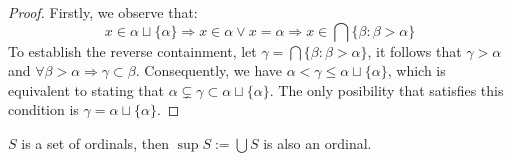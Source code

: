 \begin{proof}
  Firstly, we observe that:
  \[
    x \in \alpha \sqcup \{ \alpha \} \Rightarrow x \in \alpha \vee x = \alpha \Rightarrow x \in \bigcap \{ \beta: \beta > \alpha \}
  \]
  To establish the reverse containment, let $\gamma = \bigcap \{ \beta: \beta > \alpha \}$, it follows that $\gamma > \alpha$ and $\forall \beta > \alpha \Rightarrow \gamma \subset \beta$. Consequently, we have $\alpha < \gamma \leq \alpha \sqcup \{ \alpha \}$, which is equivalent to stating that $\alpha \subsetneq \gamma \subset \alpha \sqcup \{ \alpha \}$. The only posibility that satisfies this condition is $\gamma=\alpha \sqcup \{ \alpha \}$.


\end{proof}





\begin{corollary}
  $S$ is a set of ordinals, then $\sup S := \bigcup S$ is also an ordinal.
\end{corollary}

